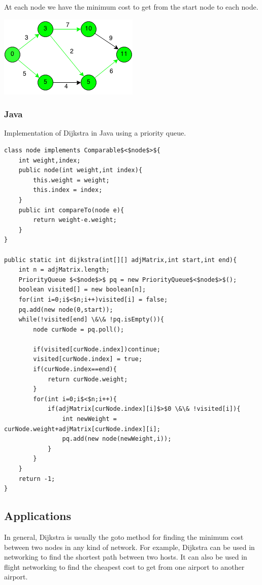 \documentclass[11pt,oneside]{book}
\makeatletter
\def\maxwidth#1{\ifdim\Gin@nat@width>#1 #1\else\Gin@nat@width\fi}
\makeatother
\begin{document}
At each node we have the minimum cost to get from the start node to each node.

\includegraphics[width=\maxwidth{\textwidth}]{djikstra6.png}

\subsubsection{Java}

Implementation of Dijkstra in Java using a priority queue.

\begin{lstlisting}
class node implements Comparable$<$node$>${
    int weight,index;
    public node(int weight,int index){
        this.weight = weight;
        this.index = index;
    }
    public int compareTo(node e){
        return weight-e.weight;
    }
}

public static int dijkstra(int[][] adjMatrix,int start,int end){
    int n = adjMatrix.length;
    PriorityQueue $<$node$>$ pq = new PriorityQueue$<$node$>$();
    boolean visited[] = new boolean[n];
    for(int i=0;i$<$n;i++)visited[i] = false;
    pq.add(new node(0,start));
    while(!visited[end] \&\& !pq.isEmpty()){
        node curNode = pq.poll();
    
        if(visited[curNode.index])continue;
        visited[curNode.index] = true;
        if(curNode.index==end){
            return curNode.weight;
        }
        for(int i=0;i$<$n;i++){
            if(adjMatrix[curNode.index][i]$>$0 \&\& !visited[i]){
                int newWeight = curNode.weight+adjMatrix[curNode.index][i];
                pq.add(new node(newWeight,i));
            }
        }
    }
    return -1;
}
\end{lstlisting}

\subsection{Applications}

In general, Dijkstra is usually the goto method for finding the minimum cost between two nodes in any kind of network. For example, Dijkstra can be used in networking to find the shortest path between two hosts. It can also be used in flight networking to find the cheapest cost to get from one airport to another airport.
\end{document}

